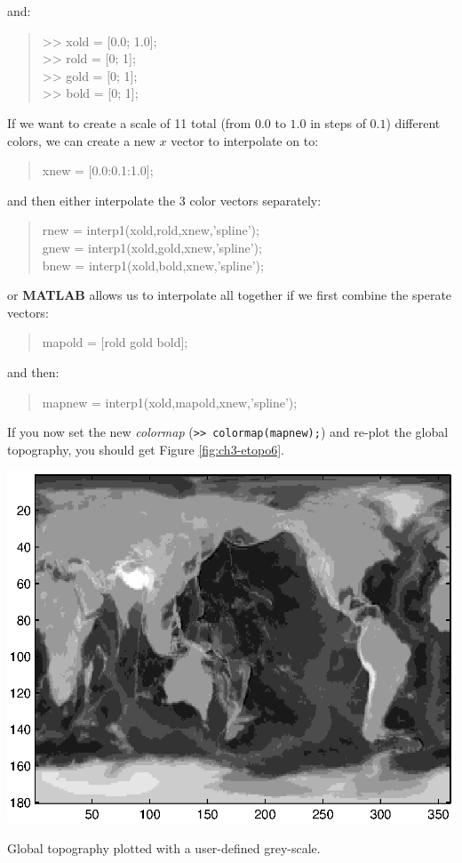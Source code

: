 \documentclass{tufte-book} %
\newenvironment{docspec}{\begin{quotation}\ttfamily\parskip0pt\parindent0pt\ignorespaces}{\end{quotation}}
\begin{document}
\noindent and:

\begin{docspec}
>> xold = [0.0; 1.0];\\
>> rold = [0; 1];\\
>> gold = [0; 1];\\
>> bold = [0; 1];
\end{docspec}

If we want to create a scale of 11 total (from \(0.0\) to \(1.0\) in steps of \(0.1\)) different colors, we can create a new \(x\) vector to interpolate on to:

\begin{docspec}
xnew = [0.0:0.1:1.0];
\end{docspec}

\noindent and then either interpolate the 3 color vectors separately:

\begin{docspec}
rnew = interp1(xold,rold,xnew,'spline');\\
gnew = interp1(xold,gold,xnew,'spline');\\
bnew = interp1(xold,bold,xnew,'spline');
\end{docspec}

\noindent or \textbf{MATLAB} allows us to interpolate all together if we first combine the sperate vectors:

\begin{docspec}
mapold = [rold gold bold];
\end{docspec}

\noindent and then:

\begin{docspec}
mapnew = interp1(xold,mapold,xnew,'spline');
\end{docspec}

If you now set the new \textit{colormap} (\texttt{>> colormap(mapnew);}) and re-plot the global topography, you should get Figure \ref{fig:ch3-etopo6}.

\begin{marginfigure}[0.0in]
\includegraphics[width=\linewidth]{ch3-etopo6.eps}
\caption{Global topography plotted with a user-defined grey-scale.}
\label{fig:ch3-etopo6}
\end{marginfigure}
\end{document}
